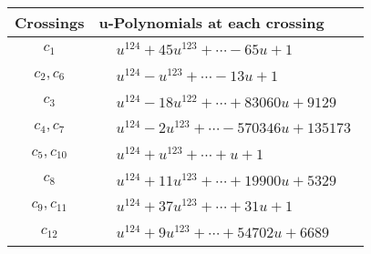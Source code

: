\documentclass[1p]{elsarticle_modified}
\theoremstyle{definition}
\begin{document}
\begin{tabular}{m{50pt}|m{274pt}}
Crossings & \hspace{64pt}u-Polynomials at each crossing \\
\hline $$\begin{aligned}c_{1}\end{aligned}$$&$\begin{aligned}
&u^{124}+45 u^{123}+\cdots-65 u+1
\end{aligned}$\\
\hline $$\begin{aligned}c_{2},c_{6}\end{aligned}$$&$\begin{aligned}
&u^{124}- u^{123}+\cdots-13 u+1
\end{aligned}$\\
\hline $$\begin{aligned}c_{3}\end{aligned}$$&$\begin{aligned}
&u^{124}-18 u^{122}+\cdots+83060 u+9129
\end{aligned}$\\
\hline $$\begin{aligned}c_{4},c_{7}\end{aligned}$$&$\begin{aligned}
&u^{124}-2 u^{123}+\cdots-570346 u+135173
\end{aligned}$\\
\hline $$\begin{aligned}c_{5},c_{10}\end{aligned}$$&$\begin{aligned}
&u^{124}+u^{123}+\cdots+u+1
\end{aligned}$\\
\hline $$\begin{aligned}c_{8}\end{aligned}$$&$\begin{aligned}
&u^{124}+11 u^{123}+\cdots+19900 u+5329
\end{aligned}$\\
\hline $$\begin{aligned}c_{9},c_{11}\end{aligned}$$&$\begin{aligned}
&u^{124}+37 u^{123}+\cdots+31 u+1
\end{aligned}$\\
\hline $$\begin{aligned}c_{12}\end{aligned}$$&$\begin{aligned}
&u^{124}+9 u^{123}+\cdots+54702 u+6689
\end{aligned}$\\
\hline
\end{tabular}\\~\\
\end{document}
